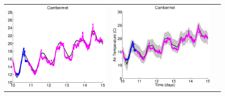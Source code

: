 \begin{figure}
\centering
\begin{tabular}{ccc}
\includegraphics[scale=0.3]{figures/slfm-weatherCambermet.eps} &
\includegraphics[scale=0.3]{figures/cgp-weatherCambermet.eps} &

\end{tabular}
\end{figure}
